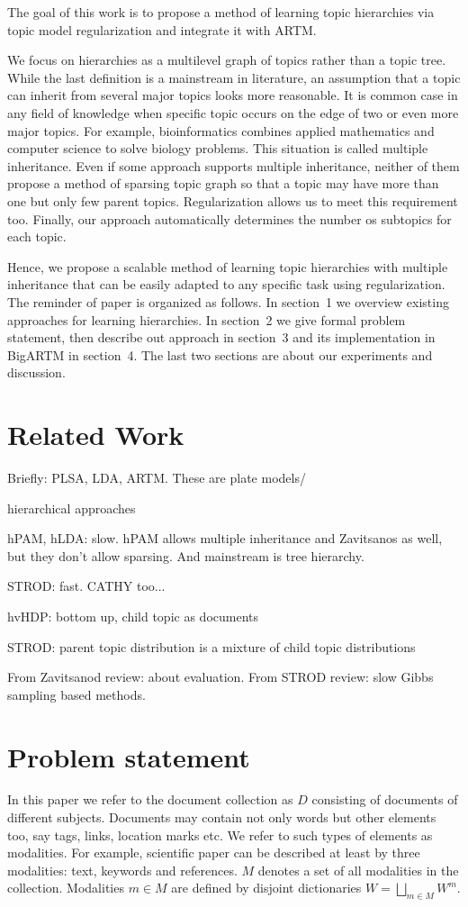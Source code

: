 \documentclass[12pt, twoside]{article}
\begin{document}
The goal of this work is to propose a method of learning topic hierarchies via topic model regularization and integrate it with ARTM. 

We focus on hierarchies as a multilevel graph of topics rather than a topic tree. While the last definition is a mainstream in literature, an assumption that a topic can inherit from several major topics looks more reasonable. 
It is common case in any field of knowledge when specific topic occurs on the edge of two or even more major topics. For example, bioinformatics combines applied mathematics and computer science to solve biology problems. This situation is called multiple inheritance.
Even if some approach supports multiple inheritance, neither of them propose a method of sparsing topic graph so that a topic may have more than one but only few parent topics. Regularization allows us to meet this requirement too.
Finally, our approach automatically determines the number os subtopics for each topic.

Hence, we propose a scalable method of learning topic hierarchies with multiple inheritance that can be easily adapted to any specific task using regularization. The reminder of paper is organized as follows. In section~1 we overview existing approaches for learning hierarchies. In section~2 we give formal problem statement, then describe out approach in section~3 and its implementation in BigARTM in section~4. The last two sections are about our experiments and discussion.

\section{Related Work}
\label{RelatedWork}


Briefly: PLSA, LDA, ARTM. These are plate models/

hierarchical approaches

hPAM, hLDA: slow. hPAM allows multiple inheritance and Zavitsanos as well, but they don't allow sparsing. And mainstream is tree hierarchy.

STROD: fast. CATHY too...

hvHDP: bottom up, child topic as documents

STROD: parent topic distribution is a mixture of child topic distributions

From Zavitsanod review: about evaluation.
From STROD review: slow Gibbs sampling based methods.

\section{Problem statement}
\label{ProblemStatement}
In this paper we refer to the document collection as $D$ consisting of documents of different subjects.
Documents may contain not only words but other elements too, say tags, links, location marks etc. We refer to such types of elements as modalities. For example, scientific paper can be described at least by three modalities: text, keywords and references. $M$ denotes a set of all modalities in the collection. Modalities $m \in M$ are defined by disjoint dictionaries $W = \bigsqcup_{m \in M} W^m$. 
\end{document}
